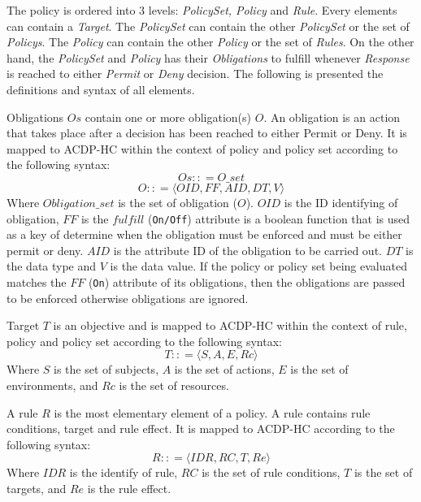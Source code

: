 The policy is ordered into 3 levels: \textit{PolicySet, Policy} and \textit{Rule}. 
Every elements can contain a \textit{Target}. The \textit{PolicySet} can contain the other \textit{PolicySet} or the set of \textit{Policys}.
The \textit{Policy} can contain the other \textit{Policy} or the set of \textit{Rules}.
On the other hand, the \textit{PolicySet} and \textit{Policy} has their \textit{Obligations} to fulfill whenever \textit{Response} is reached to either \textit{Permit} or \textit{Deny} decision. 
The following is presented the definitions and syntax of all elements.

Obligations $Os$ contain one or more obligation(s) $O$. 
An obligation is an action that takes place after a decision has been reached to either Permit or Deny.
It is mapped to ACDP-HC within the context of policy and policy set according to the following syntax:
\begin{equation}
	\textit{$Os::$}= \textit{$O\_set$}
\end{equation}
\begin{equation}
	\textit{$O::$}= \textit{$\langle OID, FF, {AID, DT, V} \rangle$}
\end{equation}
Where $Obligation\_set$ is the set of obligation ($O$). 
$OID$ is the ID identifying of obligation, $FF$ is the $fulfill$ (\texttt{On/Off}) attribute is a boolean function that is used as a key of determine when the obligation must be enforced and must be either permit or deny.  
$AID$ is the attribute ID of the obligation to be carried out. $DT$ is the data type and $V$ is the data value. 
If the policy or policy set being evaluated matches the $FF$ (\texttt{On}) attribute of its obligations, then the obligations are passed to be enforced otherwise obligations are ignored.

Target $T$ is an objective and is mapped to ACDP-HC within the context of rule, policy and policy set according to the following syntax:
\begin{equation}
	\textit{$T::$}= \textit{$\langle S, A, E, Rc \rangle $}
\end{equation}
Where $S$ is the set of subjects, $A$ is the set of actions, $E$ is the set of environments, and $Rc$ is the set of resources.

A rule $R$ is the most elementary element of a policy. 
A rule contains rule conditions, target and rule effect. 
It is mapped to ACDP-HC according to the following syntax:
\begin{equation}
	\textit{$R::$}= \textit{$\langle IDR, RC, T, Re \rangle$}
\end{equation}
Where $IDR$ is the identify of rule, $RC$ is the set of rule conditions, $T$ is the set of targets, and $Re$ is the rule effect.

